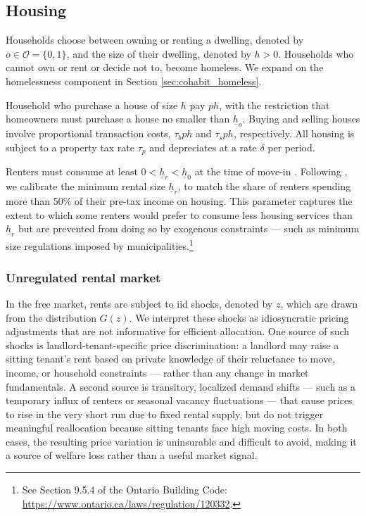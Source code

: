 \documentclass[parskip=full]{article}
\begin{document}
\subsection{Housing}\label{subsection:housing_choice}

Households choose between owning or renting a dwelling, denoted by $o \in \mathcal{O}=\{0,1\}$, and the size of their dwelling, denoted by $h>0$. Households who cannot own or rent or decide not to, become homeless. We expand on the homelessness component in Section \ref{sec:cohabit_homeless}.

Household who purchase a house of size $h$ pay $p h$, with the restriction that homeowners must purchase a house no smaller than $\underline{h}_{o}$. Buying and selling houses involve proportional transaction costs, $\tau_{b} p h$ and $\tau_{s} p h$, respectively. All housing is subject to a property tax rate $\tau_{p}$ and depreciates at a rate $\delta$ per period. 

Renters must consume at least $0<\underline{h}_{r}<\underline{h}_{0}$ at the time of move-in \citep{gervais,sommeretal-2013,sommersullivan-2017,kaplanetal-2019,rs-2023}. Following \citet{rs-2023}, we calibrate the minimum rental size $\underline{h}_{r}$, to match the share of renters spending more than 50\% of their pre-tax income on housing. This parameter captures the extent to which some renters would prefer to consume less housing services than $\underline{h}_{r}$ but are prevented from doing so by exogenous constraints — such as minimum size regulations imposed by municipalities.\footnote{See Section 9.5.4 of the Ontario Building Code: \url{https://www.ontario.ca/laws/regulation/120332}.}

\subsubsection{Unregulated rental market}

In the free market, rents are subject to iid shocks, denoted by $z$, which are drawn from the distribution $G(z)$. We interpret these shocks as idiosyncratic pricing adjustments that are not informative for efficient allocation. One source of such shocks is landlord-tenant-specific price discrimination: a landlord may raise a sitting tenant’s rent based on private knowledge of their reluctance to move, income, or household constraints — rather than any change in market fundamentals. A second source is transitory, localized demand shifts — such as a temporary influx of renters or seasonal vacancy fluctuations — that cause prices to rise in the very short run due to fixed rental supply, but do not trigger meaningful reallocation because sitting tenants face high moving costs. In both cases, the resulting price variation is uninsurable and difficult to avoid, making it a source of welfare loss rather than a useful market signal.
\end{document}
